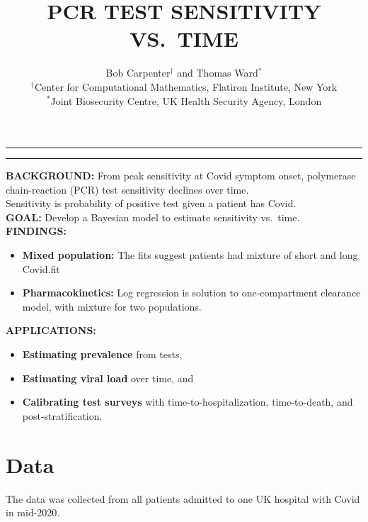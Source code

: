 \documentclass[plainboxedsections]{sciposter}
\title{\titlesize\bfseries
  \vspace*{24pt}
  PCR TEST SENSITIVITY VS.\ TIME
}
\author{
  \begin{center}
  \LARGE Bob Carpenter$^\dagger$ and Thomas Ward$^*$  \\
  \vspace*{12pt}
  \normalsize
  $^\dagger$Center for Computational Mathematics, Flatiron Institute, New York
  \\
  $^*$Joint Biosecurity Centre, UK Health Security Agency, London
  \vspace*{-48pt}
  \end{center}
}
\begin{document}

\setlength{\fboxrule}{6pt}
\setlength{\fboxsep}{9pt}
    \maketitle
    \hspace*{-1in}
{\hrule height 4pt}
\hrule
\vspace*{12pt}
\begin{multicols}{2}
\begin{mdframed}[hidealllines = true, backgroundcolor = Cerulean!10]
{\large
\textbf{BACKGROUND:} From peak sensitivity at Covid symptom onset,
polymerase chain-reaction (PCR) test sensitivity declines over time.
\\[12pt]
Sensitivity is probability of positive test given a patient has Covid.
\\[24pt]
\textbf{GOAL:} Develop a Bayesian model to estimate sensitivity vs.\ time.
\\[24pt]
\textbf{FINDINGS:}
\begin{itemize}
\item {\bfseries Mixed population:} The fits suggest patients had mixture of short and long Covid.fit
\item {\bfseries Pharmacokinetics:} Log regression is solution to one-compartment clearance model, with mixture for two populations.
\end{itemize}
\vspace*{18pt}
\textbf{APPLICATIONS:}
\begin{itemize}
\item {\bfseries Estimating prevalence} from tests,
\item {\bfseries Estimating viral load} over time, and
\item {\bfseries Calibrating test surveys} with time-to-hospitalization,
  time-to-death, and post-stratification.
\end{itemize}
}
\end{mdframed}

\section{Data}

The data was collected from all patients admitted to one UK hospital with
Covid in mid-2020.  


\end{multicols}
\end{document}
